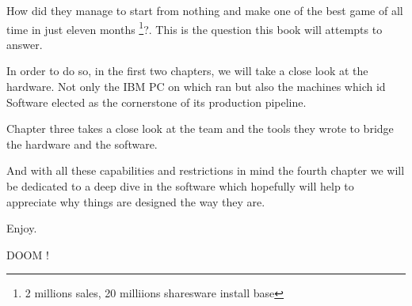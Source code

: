 \par
 How did they manage to start from nothing and make one of the best game of all time in just eleven months \footnote{2 millions sales, 20 milliions sharesware install base}?. This is the question this book will attempts to answer.\\
 \par
  In order to do so, in the first two chapters, we will take a close look at the hardware. Not only the IBM PC on which \doom ran but also the \NeXT machines which id Software elected as the cornerstone of its production pipeline.\\
  \par 
  Chapter three takes a close look at the team and the tools they wrote to bridge the hardware and the software.\\
  \par
  And with all these capabilities and restrictions in mind the fourth chapter we will be dedicated to a deep dive in the software which hopefully will help to appreciate why things are designed the way they are.\\
\par
Enjoy.

\begin{figure}[H]
\centering
{}
\end{figure}
\par
DOOM !\\
\par
\begin{figure}[H]
\centering
{}
\end{figure}
